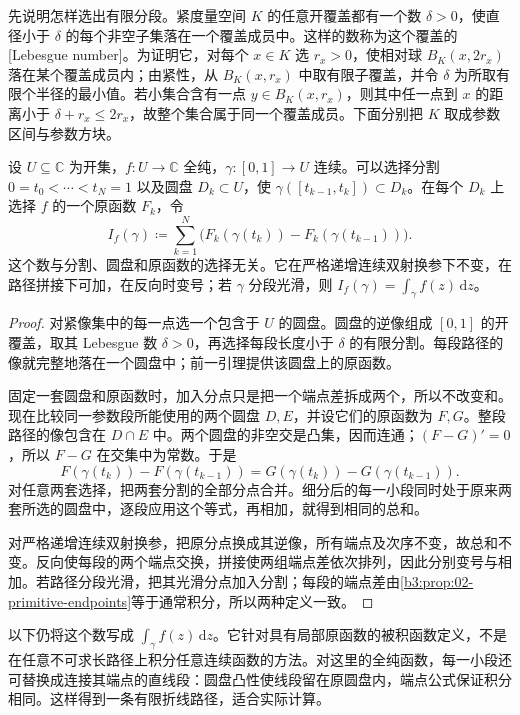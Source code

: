 \ProseParagraphBreak

先说明怎样选出有限分段。紧度量空间 \(K\) 的任意开覆盖都有一个数 \(\delta>0\)，使直径小于 \(\delta\) 的每个非空子集落在一个覆盖成员中。这样的数称为这个覆盖的[Lebesgue number]。为证明它，对每个 \(x\in K\) 选 \(r_x>0\)，使相对球 \(B_K(x,2r_x)\) 落在某个覆盖成员内；由紧性，从 \(B_K(x,r_x)\) 中取有限子覆盖，并令 \(\delta\) 为所取有限个半径的最小值。若小集合含有一点 \(y\in B_K(x,r_x)\)，则其中任一点到 \(x\) 的距离小于 \(\delta+r_x\le2r_x\)，故整个集合属于同一个覆盖成员。下面分别把 \(K\) 取成参数区间与参数方块。

\begin{lemma}[局部积分与连续路径]\label{b3:lem:02-continuous-path-integral}
设 \(U\subseteq\mathbb C\) 为开集，\(f:U\to\mathbb C\) 全纯，\(\gamma:[0,1]\to U\) 连续。可以选择分割 \(0=t_0<\cdots<t_N=1\) 以及圆盘 \(D_k\subset U\)，使 \(\gamma([t_{k-1},t_k])\subset D_k\)。在每个 \(D_k\) 上选择 \(f\) 的一个原函数 \(F_k\)，令
\[
 I_f(\gamma)\coloneqq\sum_{k=1}^N
 \bigl(F_k(\gamma(t_k))-F_k(\gamma(t_{k-1}))\bigr).
\]
这个数与分割、圆盘和原函数的选择无关。它在严格递增连续双射换参下不变，在路径拼接下可加，在反向时变号；若 \(\gamma\) 分段光滑，则 \(I_f(\gamma)=\int_\gamma f(z)\,\mathrm{d}z\)。
\end{lemma}
\begin{proof}
对紧像集中的每一点选一个包含于 \(U\) 的圆盘。圆盘的逆像组成 \([0,1]\) 的开覆盖，取其 Lebesgue 数 \(\delta>0\)，再选择每段长度小于 \(\delta\) 的有限分割。每段路径的像就完整地落在一个圆盘中；前一引理提供该圆盘上的原函数。

固定一套圆盘和原函数时，加入分点只是把一个端点差拆成两个，所以不改变和。现在比较同一参数段所能使用的两个圆盘 \(D,E\)，并设它们的原函数为 \(F,G\)。整段路径的像包含在 \(D\cap E\) 中。两个圆盘的非空交是凸集，因而连通；\((F-G)'=0\)，所以 \(F-G\) 在交集中为常数。于是
\[
 F(\gamma(t_k))-F(\gamma(t_{k-1}))
 =G(\gamma(t_k))-G(\gamma(t_{k-1})).
\]
对任意两套选择，把两套分割的全部分点合并。细分后的每一小段同时处于原来两套所选的圆盘中，逐段应用这个等式，再相加，就得到相同的总和。

对严格递增连续双射换参，把原分点换成其逆像，所有端点及次序不变，故总和不变。反向使每段的两个端点交换，拼接使两组端点差依次排列，因此分别变号与相加。若路径分段光滑，把其光滑分点加入分割；每段的端点差由\cref{b3:prop:02-primitive-endpoints}等于通常积分，所以两种定义一致。
\end{proof}

以下仍将这个数写成 \(\int_\gamma f(z)\,\mathrm{d}z\)。它针对具有局部原函数的被积函数定义，不是在任意不可求长路径上积分任意连续函数的方法。对这里的全纯函数，每一小段还可替换成连接其端点的直线段：圆盘凸性使线段留在原圆盘内，端点公式保证积分相同。这样得到一条有限折线路径，适合实际计算。

